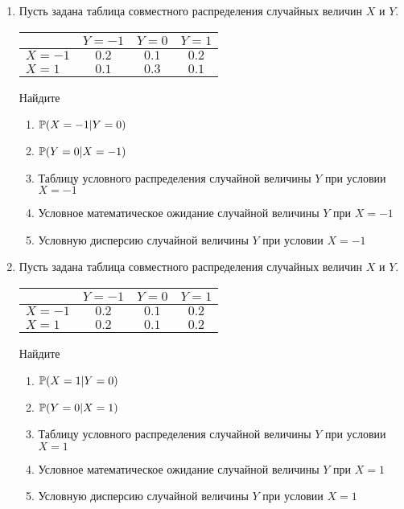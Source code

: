 \begin{enumerate}
\item
Пусть задана таблица совместного распределения случайных величин $X$ и $Y$.

\begin{center}
\begin{tabular}{lccc}
\toprule
                       & $Y=-1$  & $Y=0$   & $Y=1$   \\ \midrule
$X=-1$                 & $0.2$ & $0.1$ & $0.2$ \\
 $X=1$                 & $0.1$ & $0.3$ & $0.1$ \\ \bottomrule
\end{tabular}
\end{center}

Найдите
\begin{enumerate}
\item $\P(X = -1 | Y = 0)$
\item $\P(Y = 0 | X = -1)$
\item Таблицу условного распределения случайной величины $Y$ при условии $X = -1$
\item Условное математическое ожидание случайной величины $Y$ при $X = -1$
\item Условную дисперсию случайной величины $Y$ при условии $X = -1$
\end{enumerate}

\item Пусть задана таблица совместного распределения случайных величин $X$ и $Y$.

\begin{center}
\begin{tabular}{lccc}
\toprule
                   & $Y=-1$  & $Y=0$   & $Y=1$   \\ \midrule
$X=-1$                 & $0.2$ & $0.1$ & $0.2$ \\
 $X=1$                 & $0.2$ & $0.1$ & $0.2$ \\ \bottomrule
\end{tabular}
\end{center}

Найдите
\begin{enumerate}
\item $\P(X = 1 | Y = 0)$
\item $\P(Y = 0 | X = 1)$
\item Таблицу условного распределения случайной величины $Y$ при условии $X = 1$
\item Условное математическое ожидание случайной величины $Y$ при $X = 1$
\item Условную дисперсию случайной величины $Y$ при условии $X = 1$
\end{enumerate}


\end{enumerate}
